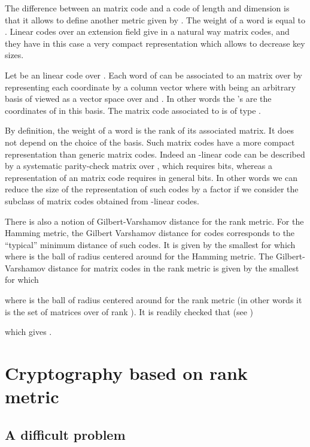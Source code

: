 \documentclass[11pt, a4paper]{llncs}
\begin{document}
The difference between an  matrix code and a code of length  and  dimension  is that it allows 
to define another metric given by . The weight of a word  is equal to . 
Linear codes over an extension field  give in a natural way matrix codes, and they have in this case a very compact
representation which allows to decrease key sizes.

\begin{definition}\label{def_linear_code}
Let  be an  linear code over . Each word  of  can be associated to an  matrix over  by representing
each coordinate  by a column vector  where  
with  being an arbitrary basis of   viewed as a vector space over  and
. In other words the 's are the coordinates of  in this basis. The matrix code associated to  is of type .
\end{definition}


By definition, the weight of a word  is the rank of its associated matrix. It does not depend on the choice of the basis. 
Such matrix codes have a more compact representation than generic matrix codes. Indeed an  -linear code can be described by a systematic parity-check matrix over  , which requires  bits, whereas a representation of an  matrix code requires in general  bits. In other words we  can reduce the size of the representation of such codes by a factor  if we
consider the subclass of matrix codes obtained from -linear codes.

There is also a notion of Gilbert-Varshamov distance for the rank metric. 
For the Hamming metric, the Gilbert Varshamov distance for  codes corresponds to 
the ``typical'' minimum distance of such codes. It is given by the smallest  for which 
 where  is the  ball of
radius  centered around  for the Hamming metric. The Gilbert-Varshamov distance for  matrix codes in the rank metric is given by the smallest 
 for which 

where 
 is the  ball of
radius  centered around   for the rank  metric (in other words it is the set of  matrices
over  of rank ).
It is readily checked that (see \cite{LN97})

which gives  .
 

\section{Cryptography based on rank metric}

\subsection{A difficult problem}
\end{document}
